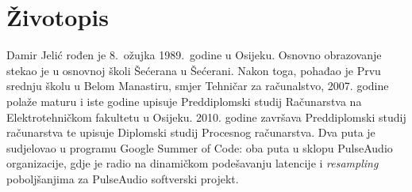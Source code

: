 \newpage

\chapter*{Životopis}

Damir Jelić rođen je 8.~ožujka 1989.~godine u Osijeku. Osnovno
obrazovanje stekao je u osnovnoj školi Šećerana u Šećerani. Nakon toga,
pohađao je Prvu srednju školu u Belom Manastiru, smjer Tehničar za računalstvo,
2007. godine polaže maturu i iste godine upisuje Preddiplomski studij
Računarstva na Elektrotehničkom fakultetu u Osijeku. 2010. godine završava
Preddiplomski studij računarstva te upisuje Diplomski studij Procesnog
računarstva. Dva puta je sudjelovao u programu Google Summer of Code: oba puta u
sklopu PulseAudio organizacije, gdje je radio na dinamičkom podešavanju latencije
i \emph{resampling} poboljšanjima za PulseAudio softverski projekt.

\vspace{1cm}
\noindent \vspace*{1.0cm} \makebox[1.5in]{\hrulefill}
